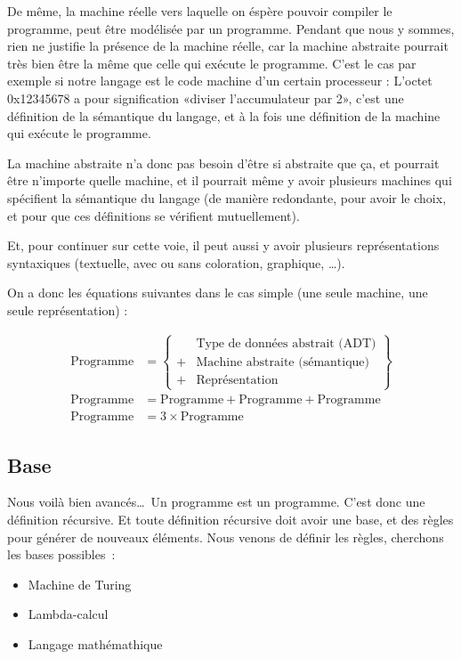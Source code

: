 \documentclass{article}
\begin{document}
De même, la machine réelle vers laquelle on éspère pouvoir compiler le programme, peut être modélisée par un programme. Pendant que nous y sommes, rien ne justifie la présence de la machine réelle, car la machine abstraite pourrait très bien être la même que celle qui exécute le programme. C'est le cas par exemple si notre langage est le code machine d'un certain processeur : L'octet 0x12345678 a pour signification «diviser l'accumulateur par 2», c'est une définition de la sémantique du langage, et à la fois une définition de la machine qui exécute le programme.

La machine abstraite n'a donc pas besoin d'être si abstraite que ça, et pourrait être n'importe quelle machine, et il pourrait même y avoir plusieurs machines qui spécifient la sémantique du langage (de manière redondante, pour avoir le choix, et pour que ces définitions se vérifient mutuellement).

Et, pour continuer sur cette voie, il peut aussi y avoir plusieurs représentations syntaxiques (textuelle, avec ou sans coloration, graphique, \dots).

On a donc les équations suivantes dans le cas simple (une seule machine, une seule représentation) :

\begin{align}
  \text{Programme} &= \left\lbrace
      \begin{array}{rl}
          &\text{Type de données abstrait (ADT)}\\
        + &\text{Machine abstraite (sémantique)}\\
        + &\text{Représentation}
      \end{array}
      \right\rbrace\\
  \text{Programme} &= \text{Programme} + \mathrm{Programme} + \mathrm{Programme}\\
  \text{Programme} &= 3 \times \text{Programme}
\end{align}

\subsection{Base}

Nous voilà bien avancés\dots\ Un programme est un programme. C'est donc une définition récursive. Et toute définition récursive doit avoir une base, et des règles pour générer de nouveaux éléments. Nous venons de définir les règles, cherchons les bases possibles~:
\begin{itemize}
\item Machine de Turing
\item Lambda-calcul
\item Langage mathémathique
\end{itemize}
\end{document}
